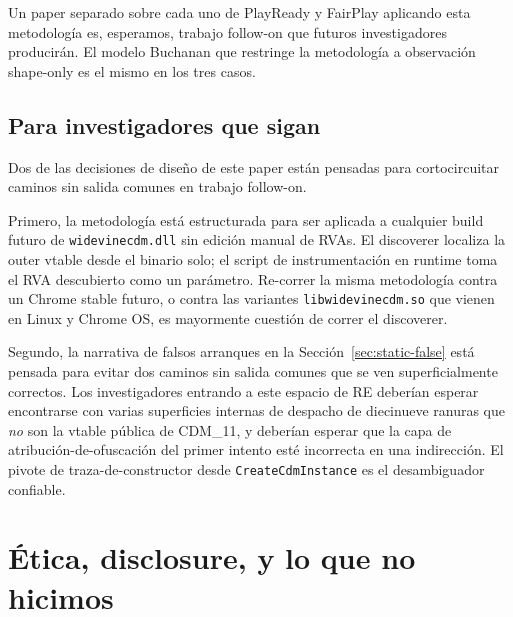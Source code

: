 \documentclass[11pt,letterpaper]{article}
\let\oldsection\section
\renewcommand{\section}{\clearpage\oldsection}
\begin{document}
Un paper separado sobre cada uno de PlayReady y FairPlay
aplicando esta metodología es, esperamos, trabajo follow-on que
futuros investigadores producirán. El modelo Buchanan que
restringe la metodología a observación shape-only es el mismo
en los tres casos.

\subsection*{Para investigadores que sigan}

Dos de las decisiones de diseño de este paper están pensadas
para cortocircuitar caminos sin salida comunes en trabajo
follow-on.

Primero, la metodología está estructurada para ser aplicada a
cualquier build futuro de \texttt{widevinecdm.dll} sin edición
manual de RVAs. El discoverer localiza la outer vtable desde el
binario solo; el script de instrumentación en runtime toma el
RVA descubierto como un parámetro. Re-correr la misma metodología
contra un Chrome stable futuro, o contra las variantes
\texttt{libwidevinecdm.so} que vienen en Linux y Chrome OS, es
mayormente cuestión de correr el discoverer.

Segundo, la narrativa de falsos arranques en la
Sección~\ref{sec:static-false} está pensada para evitar dos
caminos sin salida comunes que se ven superficialmente correctos.
Los investigadores entrando a este espacio de RE deberían esperar
encontrarse con varias superficies internas de despacho de
diecinueve ranuras que \emph{no} son la vtable pública de
CDM\_11, y deberían esperar que la capa de
atribución-de-ofuscación del primer intento esté incorrecta en
una indirección. El pivote de traza-de-constructor desde
\texttt{CreateCdmInstance} es el desambiguador confiable.

\section{Ética, disclosure, y lo que no hicimos}
\label{sec:ethics}
\end{document}
